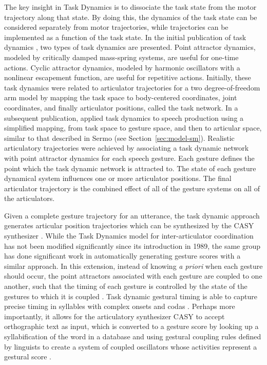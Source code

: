 The key insight in Task Dynamics
is to dissociate the task state
from the motor trajectory
along that state.
By doing this, the dynamics of the task state
can be considered separately from motor trajectories,
while trajectories can be implemented
as a function of the task state.
In the initial publication of task dynamics
\citep{saltzman1987},
two types of task dynamics are presented.
Point attractor dynamics,
modeled by critically damped mass-spring systems,
are useful for one-time actions.
Cyclic attractor dynamics,
modeled by harmonic oscillators
with a nonlinear escapement function,
are useful for repetitive actions.
Initially, these task dynamics were
related to articulator trajectories
for a two degree-of-freedom arm model
by mapping the task space
to body-centered coordinates,
joint coordinates,
and finally articulator positions,
called the task network.
In a subsequent publication,
\citet{saltzman1989}
applied task dynamics to speech production
using a simplified mapping,
from task space
to gesture space,
and then to articular space,
similar to that described in Sermo
(see Section~\ref{sec:model-sm}).
Realistic articulatory trajectories
were achieved
by associating a task dynamic network
with point attractor dynamics
for each speech gesture.
Each gesture defines
the point which the task dynamic network
is attracted to.
The state of each gesture dynamical system
influences one or more articulator positions.
The final articulator trajectory
is the combined effect
of all of the gesture systems
on all of the articulators.

Given a complete gesture trajectory
for an utterance,
the task dynamic approach
generates articular position trajectories
which can be synthesized
by the CASY synthesizer \citep{iskarous2003}.
While the Task Dynamics model
for inter-articulator coordination has not been
modified significantly since its introduction in 1989,
the same group has done significant work
in automatically generating gesture scores
with a similar approach.
In this extension,
instead of knowing \textit{a priori}
when each gesture should occur,
the point attractors associated
with each gesture are coupled
to one another,
such that the timing of each gesture
is controlled by the state
of the gestures to which it is coupled
\citep{saltzman2000}.
Task dynamic gestural timing
is able to capture precise timing
in syllables with complex onsets
and codas \citep{nam2003,goldstein2006}.
Perhaps more importantly,
it allows for the articulatory synthesizer
CASY to accept orthographic text as input,
which is converted to a gesture score
by looking up a syllabification
of the word in a database
and using gestural coupling rules
defined by linguists
to create a system of coupled oscillators
whose activities represent a gestural score
\citep{nam2004,goldstein2009}.

